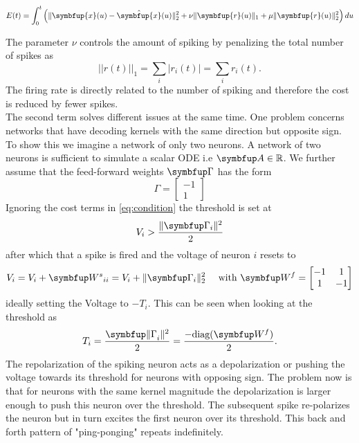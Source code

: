 \begin{equation}\label{eq:cost_func}
E(t)=\int_0^t \left(\|\symbfup{x}(u)-\hat{\symbfup{x}}(u)\|_2^2+\nu\|\symbfup{r}(u)\|_1+\mu\|\symbfup{r}(u)\|_2^2\right)d u
\end{equation}

The parameter $\nu$ controls the amount of spiking by penalizing the total number of spikes as
\begin{equation}
||r(t)||_1 = \sum_i|r_i(t)| = \sum_i r_i(t).
\end{equation}
The firing rate is directly related to the number of spiking and therefore the cost is reduced by fewer spikes.\\

The second term solves different issues at the same time. One problem concerns networks that have decoding kernels with the same direction but opposite sign. To show this we imagine a network of only two neurons. A network of two neurons is sufficient to simulate a scalar \ac{ODE} i.e $\bmu{A}\in \mathbb{R}$. We further assume that the feed-forward weights $\bmu{\Gamma}$ has the form
\begin{equation}
\Gamma = \begin{bmatrix}
-1\\1
\end{bmatrix}
\end{equation}
Ignoring the cost terms in \cref{eq:condition} the threshold is set at
\begin{equation}
V_i > \frac{\|\bmu{\Gamma}_i\|^2}{2}
\end{equation}
after which that a spike is fired and the voltage of neuron $i$  resets to
\begin{equation}
V_i = V_i + \bmu{W^s}_{ii} = V_i + \|\bmu{\Gamma}_i\|^2_2 \quad \text{ with } \bmu{W^f} = \begin{bmatrix}
-1& 1\\
1& -1
\end{bmatrix}
\end{equation}
ideally setting the Voltage to $-T_i$. This can be seen when looking at the threshold as
\begin{equation}
T_i =\frac{ \bmu{\|\Gamma}_i\|^2}{2}= \frac{-\text{diag}(\bmu{W^f})}{2}.
\end{equation}
The repolarization of the spiking neuron acts as a depolarization or pushing the voltage towards its threshold for neurons with opposing sign. The problem now is that for neurons with the same kernel magnitude the depolarization is larger enough to push this neuron over the threshold. The subsequent spike re-polarizes the neuron but in turn excites the first neuron over its threshold. This back and forth pattern of "ping-ponging" repeats indefinitely.\\
